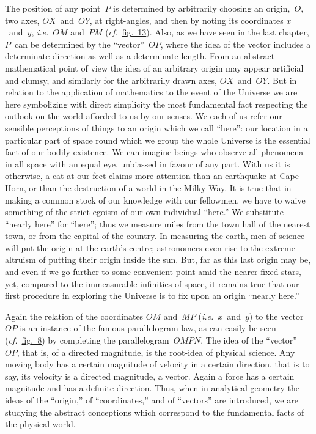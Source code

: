 \documentclass[12pt,leqno]{book}[2005/09/16]
\newcommand{\Fig}[2][Fig.]{\hyperref[fig:#2]{#1~#2}}
\newcommand{\PageSep}[1]{\ignorespaces}
\newcommand{\cf}{\emph{cf.}}
\newcommand{\ie}{\emph{i.e.}}
\begin{document}
The position of any point~$P$ is determined
by arbitrarily choosing an origin,~$O$, two axes,
%
$OX$~and~$OY$, at right-angles, and then by
noting its coordinates $x$~and~$y$, \ie\ $OM$ and~$PM$
(\cf\ \Fig[fig.]{13}). Also, as we have seen in the
last chapter, $P$~can be determined by the
``vector''~$OP$, where the idea of the vector
includes a determinate direction as well as a
determinate length. From an abstract
mathematical point of view the idea of an
arbitrary origin may appear artificial and
clumsy, and similarly for the arbitrarily
drawn axes, $OX$~and~$OY$. But in relation to
the application of mathematics to the event
of the Universe we are here symbolizing with
direct simplicity the most fundamental fact
respecting the outlook on the world afforded
to us by our senses. We each of us refer
our sensible perceptions of things to an origin
which we call ``here'': our location in a
particular part of space round which we
group the whole Universe is the essential fact
of our bodily existence. We can imagine
beings who observe all phenomena in all space
with an equal eye, unbiassed in favour of any
part. With us it is otherwise, a cat at our
\PageSep{126}
feet claims more attention than an earthquake
at Cape Horn, or than the destruction
of a world in the Milky Way. It is true that
in making a common stock of our knowledge
with our fellowmen, we have to waive something
of the strict egoism of our own individual
``here.'' We substitute ``nearly
here'' for ``here''; thus we measure miles
from the town hall of the nearest town, or
from the capital of the country. In measuring
the earth, men of science will put the
origin at the earth's centre; astronomers
%
even rise to the extreme altruism of putting
their origin inside the sun. But, far as this
last origin may be, and even if we go further
to some convenient point amid the nearer
fixed stars, yet, compared to the immeasurable
infinities of space, it remains true that
our first procedure in exploring the Universe
is to fix upon an origin ``nearly here.''

Again the relation of the coordinates $OM$
and~$MP$ (\ie\ $x$~and~$y$) to the vector~$OP$ is an
instance of the famous parallelogram law, as
%
can easily be seen (\cf\ \Fig[fig.]{8}) by completing
the parallelogram~$OMPN$. The idea of the
``vector''~$OP$, that is, of a directed magnitude,
is the root-idea of physical science.
Any moving body has a certain magnitude
of velocity in a certain direction, that is to
say, its velocity is a directed magnitude, a
vector. Again a force has a certain magnitude
\PageSep{127}
and has a definite direction. Thus,
when in analytical geometry the ideas of the
``origin,'' of ``coordinates,'' and of ``vectors''
are introduced, we are studying the
abstract conceptions which correspond to the
fundamental facts of the physical world.
\PageSep{128}
\end{document}
